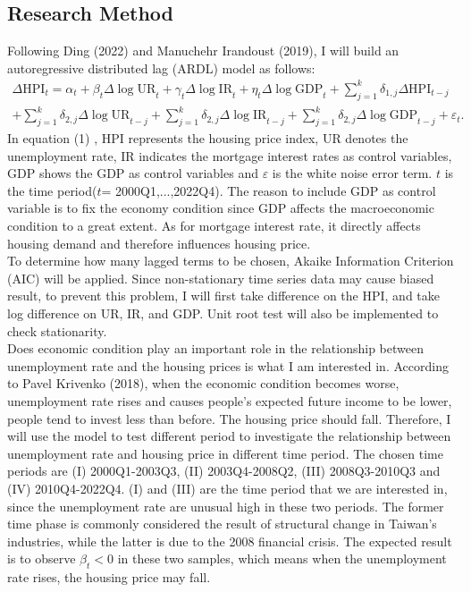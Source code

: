 \documentclass[12pt]{article}
\begin{document}
\begin{spacing}{2}
\section{Research Method}
Following Ding (2022) and Manuchehr Irandoust (2019), I will build an autoregressive distributed lag (ARDL) model as follows:
\begin{equation}
\begin{split}
\Delta{\mathrm{HPI}}_{t} = \alpha_{t}+\beta_{t}\Delta{\log\mathrm{UR}}_{t}
+\gamma_{t}\Delta{\log\mathrm{IR}}_{t}+\eta_{t}\Delta{\log\mathrm{GDP}}_{t}+\sum_{j=1}^{k}\delta_{1,j}\Delta{\mathrm{HPI}}_{t-j}\\
+\sum_{j=1}^{k}\delta_{2,j}\Delta{\log\mathrm{UR}}_{t-j}+\sum_{j=1}^{k}\delta_{2,j}\Delta{\log\mathrm{IR}}_{t-j}+
\sum_{j=1}^{k}\delta_{2,j}\Delta{\log\mathrm{GDP}}_{t-j}+\varepsilon_{t}.
\end{split}
\end{equation} 
\hspace*{0.5cm}In equation (1) , HPI represents the housing price index, UR denotes the unemployment rate, IR indicates the mortgage interest rates as control variables, GDP shows the GDP as control variables and $\varepsilon$ is the white noise error term. $t$ is the time period($t $= 2000Q1,...,2022Q4).
The reason to include GDP as control variable is to fix the economy condition since GDP affects the macroeconomic condition to a great extent. As for mortgage interest rate, it directly affects housing demand and therefore influences housing price.\\
\hspace*{0.5cm}To determine how many lagged terms to be chosen, Akaike Information Criterion (AIC) will be applied. Since non-stationary time series data may cause biased result, to prevent this problem, I will first take difference on the HPI, and take log difference on UR, IR, and GDP. Unit root test will also be implemented to check stationarity.\\
\hspace*{0.5cm}Does economic condition play an important role in the relationship between unemployment rate and the housing prices is what I am interested in. According to Pavel Krivenko (2018), when the economic condition becomes worse, unemployment rate rises and causes people's expected future income to be lower, people tend to invest less than before. The housing price should fall.
\hspace*{0.5cm}Therefore, I will use the model to test different period to investigate the relationship between unemployment rate and housing price in different time period. The chosen time periods are (I) 2000Q1-2003Q3, (II) 2003Q4-2008Q2, (III) 2008Q3-2010Q3 and (IV) 2010Q4-2022Q4. (I) and (III) are the time period that we are interested in, since the unemployment rate are unusual high in these two periods. The former time phase is commonly considered the result of  structural change in Taiwan's industries, while the latter is due to the 2008 financial crisis. The expected result is to observe $\beta_t < 0$ in these two samples, which means when the unemployment rate rises, the housing price may fall.\\

\end{spacing}
\end{document}
